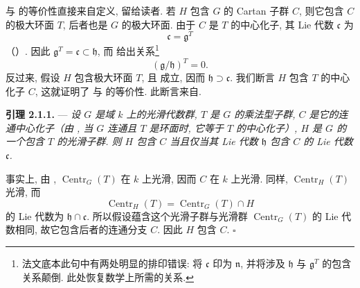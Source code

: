  与  的等价性直接来自定义, 留给读者. 若 \(H\) 包含 \(G\) 的 Cartan 子群 \(C\), 则它包含 \(C\) 的极大环面 \(T\), 后者也是 \(G\) 的极大环面. 由于 \(C\) 是 \(T\) 的中心化子, 其 Lie 代数 \(\mathfrak c\) 为
\[
  \mathfrak c=\mathfrak g^T
\]
（）. 因此 \(\mathfrak g^T=\mathfrak c\subset\mathfrak h\), 而  给出关系\footnote{法文底本此句中有两处明显的排印错误: 将 \(\mathfrak c\) 印为 \(\mathfrak n\), 并将涉及 \(\mathfrak h\) 与 \(\mathfrak g^T\) 的包含关系颠倒. 此处恢复数学上所需的关系.}
\[
\tag{x}
  (\mathfrak g/\mathfrak h)^T=0.
\]
反过来, 假设 \(H\) 包含极大环面 \(T\), 且  成立, 因而 \(\mathfrak h\supset\mathfrak c\). 我们断言 \(H\) 包含 \(T\) 的中心化子 \(C\), 这就证明了  与  的等价性. 此断言来自.

\medskip
\noindent{}\textbf{引理 2.1.1.} ---
\textit{设 \(G\) 是域 \(k\) 上的光滑代数群, \(T\) 是 \(G\) 的乘法型子群, \(C\) 是它的连通中心化子（由 , 当 \(G\) 连通且 \(T\) 是环面时, 它等于 \(T\) 的中心化子）, \(H\) 是 \(G\) 的一个包含 \(T\) 的光滑子群. 则 \(H\) 包含 \(C\) 当且仅当其 Lie 代数 \(\mathfrak h\) 包含 \(C\) 的 Lie 代数 \(\mathfrak c\).}

事实上, 由 , \(\operatorname{Centr}_G(T)\) 在 \(k\) 上光滑, 因而 \(C\) 在 \(k\) 上光滑. 同样, \(\operatorname{Centr}_H(T)\) 光滑, 而
\[
  \operatorname{Centr}_H(T)=\operatorname{Centr}_G(T)\cap H
\]
的 Lie 代数为 \(\mathfrak h\cap\mathfrak c\). 所以假设蕴含这个光滑子群与光滑群 \(\operatorname{Centr}_G(T)\) 的 Lie 代数相同, 故它包含后者的连通分支 \(C\). 因此 \(H\) 包含 \(C\).
\hfill\(\square\)

